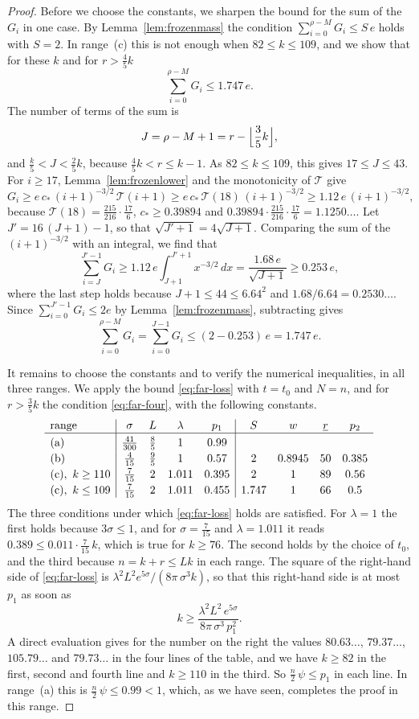 \documentclass{amsart}
\theoremstyle{definition}
\theoremstyle{remark}
\numberwithin{equation}{section}
\begin{document}
\begin{proof}
Before we choose the constants, we sharpen the bound for the sum of the $G_i$ in one case. By Lemma~\ref{lem:frozenmass} the condition $\sum_{i=0}^{\rho-M}G_i\le S\,e$ holds with $S=2$. In range~(c) this is not enough when $82\le k\le 109$, and we show that for these $k$ and for $r>\frac45k$
\[
\sum_{i=0}^{\rho-M}G_i\le 1.747\,e .
\]
The number of terms of the sum is
\[
J=\rho-M+1=r-\Bigl\lfloor\frac35k\Bigr\rfloor,
\]
and $\frac k5<J<\frac25k$, because $\frac45k<r\le k-1$. As $82\le k\le 109$, this gives $17\le J\le 43$. For $i\ge 17$, Lemma~\ref{lem:frozenlower} and the monotonicity of $\mathcal{T}$ give
\[
G_i\ge e\,c_\ast\,(i+1)^{-3/2}\,\mathcal{T}(i+1)\ge e\,c_\ast\,\mathcal{T}(18)\,(i+1)^{-3/2}\ge 1.12\,e\,(i+1)^{-3/2},
\]
because $\mathcal{T}(18)=\frac{215}{216}\cdot\frac{17}{6}$, $c_\ast\ge 0.39894$ and $0.39894\cdot\frac{215}{216}\cdot\frac{17}{6}=1.1250\ldots$. Let $J'=16\,(J+1)-1$, so that $\sqrt{J'+1}=4\sqrt{J+1}$. Comparing the sum of the $(i+1)^{-3/2}$ with an integral, we find that
\[
\sum_{i=J}^{J'-1}G_i\ge 1.12\,e\int_{J+1}^{J'+1}x^{-3/2}\,dx=\frac{1.68\,e}{\sqrt{J+1}}\ge 0.253\,e,
\]
where the last step holds because $J+1\le 44\le 6.64^2$ and $1.68/6.64=0.2530\ldots$. Since $\sum_{i=0}^{J'-1}G_i\le 2e$ by Lemma~\ref{lem:frozenmass}, subtracting gives
\[
\sum_{i=0}^{\rho-M}G_i=\sum_{i=0}^{J-1}G_i\le(2-0.253)\,e=1.747\,e .
\]

It remains to choose the constants and to verify the numerical inequalities, in all three ranges. We apply the bound \eqref{eq:far-loss} with $t=t_0$ and $N=n$, and for $r>\frac35k$ the condition \eqref{eq:far-four}, with the following constants.
\[
\begin{array}{l|cccc|cccc}
\text{range} & \sigma & L & \lambda & p_1 & S & w & \underline r & p_2\\ \hline
\textup{(a)}\rule{0pt}{2.6ex} & \frac{41}{300} & \frac85 & 1 & 0.99 & & & & \\[2pt]
\textup{(b)} & \frac{4}{15} & \frac95 & 1 & 0.57 & 2 & 0.8945 & 50 & 0.385\\[2pt]
\textup{(c)},\ k\ge 110 & \frac{7}{15} & 2 & 1.011 & 0.395 & 2 & 1 & 89 & 0.56\\[2pt]
\textup{(c)},\ k\le 109 & \frac{7}{15} & 2 & 1.011 & 0.455 & 1.747 & 1 & 66 & 0.5
\end{array}
\]
The three conditions under which \eqref{eq:far-loss} holds are satisfied. For $\lambda=1$ the first holds because $3\sigma\le 1$, and for $\sigma=\frac{7}{15}$ and $\lambda=1.011$ it reads $0.389\le 0.011\cdot\frac{7}{15}\,k$, which is true for $k\ge 76$. The second holds by the choice of $t_0$, and the third because $n=k+r\le Lk$ in each range. The square of the right-hand side of \eqref{eq:far-loss} is $\lambda^2L^2e^{5\sigma}/(8\pi\,\sigma^3k)$, so that this right-hand side is at most $p_1$ as soon as
\[
k\ge\frac{\lambda^2L^2\,e^{5\sigma}}{8\pi\,\sigma^3\,p_1^2} .
\]
A direct evaluation gives for the number on the right the values $80.63\ldots$, $79.37\ldots$, $105.79\ldots$ and $79.73\ldots$ in the four lines of the table, and we have $k\ge 82$ in the first, second and fourth line and $k\ge 110$ in the third. So $\frac n2\,\psi\le p_1$ in each line. In range~(a) this is $\frac n2\,\psi\le 0.99<1$, which, as we have seen, completes the proof in this range.


\end{proof}
\end{document}
